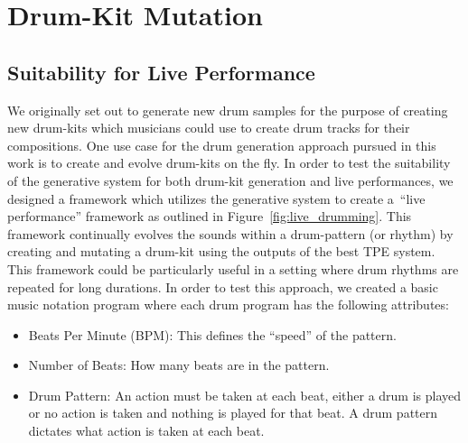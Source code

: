 \documentclass[\main/thesis.tex]{subfiles}
\begin{document}
\chapter{Drum-Kit Mutation}
\section{Suitability for Live Performance}

We originally set out to generate new drum samples for the purpose of creating new drum-kits which musicians could use to create drum tracks for their compositions. One use case for the drum generation approach pursued in this work is to create and evolve drum-kits on the fly.  In order to test the suitability of the generative system for both drum-kit generation and live performances, we designed a framework which utilizes the generative system to create a~\enquote{live performance} framework as outlined in Figure~\ref{fig:live_drumming}. This framework continually evolves the sounds within a drum-pattern (or rhythm) by creating and mutating a drum-kit using the outputs of the best TPE system. This framework could be particularly useful in a setting where drum rhythms are repeated for long durations. In order to test this approach, we created a basic music notation program where each drum program has the following attributes:

\begin{itemize}
    \item Beats Per Minute (BPM): This defines the \enquote{speed} of the pattern. 
    \item Number of Beats: How many beats are in the pattern.
    \item Drum Pattern: An action must be taken at each beat, either a drum is played or no action is taken and nothing is played for that beat. A drum pattern dictates what action is taken at each beat.
\end{itemize}
\end{document}
